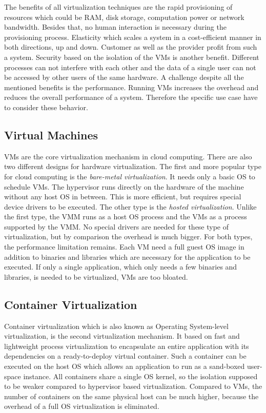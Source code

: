 The benefits of all virtualization techniques are the rapid provisioning of resources which could be \ac{RAM}, disk storage, computation power or network bandwidth.
Besides that, no human interaction is necessary during the provisioning process.
Elasticity which scales a system in a cost-efficient manner in both directions, up and down.
Customer as well as the provider profit from such a system.
Security based on the isolation of the \acp{VM} is another benefit.
Different processes can not interfere with each other and the data of a single user can not be accessed by other users of the same hardware.
A challenge despite all the mentioned benefits is the performance.
Running \acp{VM} increases the overhead and reduces the overall performance of a system.
Therefore the specific use case have to consider these behavior.


\subsection{Virtual Machines}
\acp{VM} are the core virtualization mechanism in cloud computing.
There are also two different designs for hardware virtualization.
The first and more popular type for cloud computing is the \textit{bare-metal virtualization}.
It needs only a basic OS to schedule \acp{VM}.
The hypervisor runs directly on the hardware of the machine without any host \ac{OS} in between.
This is more efficient, but requires special device drivers to be executed.
The other type is the \textit{hosted virtualization}.
Unlike the first type, the \ac{VMM} runs as a host \ac{OS} process and the \acp{VM} as a process supported by the \ac{VMM}.
No special drivers are needed for these type of virtualization, but by comparison the overhead is much bigger.
For both types, the performance limitation remains.
Each \ac{VM} need a full guest \ac{OS} image in addition to binaries and libraries which are necessary for the application to be executed.\autocite[cf.][p. 381]{Pahl:2015}
If only a single application, which only needs a few binaries and libraries, is needed to be virtualized, \acp{VM} are too bloated.


\subsection{Container Virtualization}
Container virtualization which is also known as Operating System-level virtualization, is the second virtualization mechanism.
It based on fast and lightweight process virtualization to encapsulate an entire application with its dependencies on a ready-to-deploy virtual container.\autocite[cf.][p. 72]{Tosatto:2015}
Such a container can be executed on the host \ac{OS} which allows an application to run as a sand-boxed user-space instance.\autocite[cf.][p. 1]{Anderson:2016}
All containers share a single \ac{OS} kernel, so the isolation supposed to be weaker compared to hypervisor based virtualization.\autocite[cf.][p. 2]{Celesti:2016}
Compared to \acp{VM}, the number of containers on the same physical host can be much higher, because the overhead of a full \ac{OS} virtualization is eliminated.\autocite[cf.][p. 2]{Celesti:2016}


